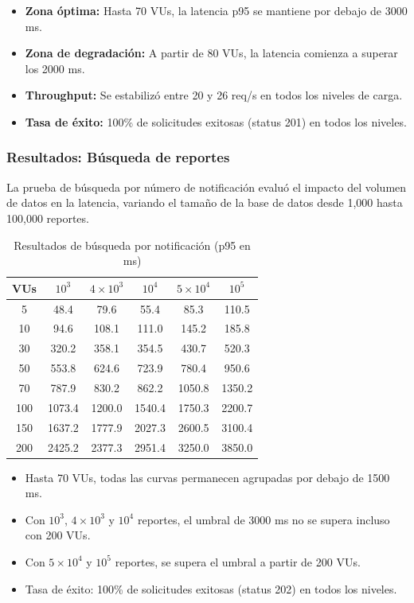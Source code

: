 \documentclass[12pt,letterpaper]{article}
\begin{document}
\begin{itemize}
    \item \textbf{Zona óptima:} Hasta 70 VUs, la latencia p95 se mantiene por debajo de 3000 ms.
    \item \textbf{Zona de degradación:} A partir de 80 VUs, la latencia comienza a superar los 2000 ms.
    \item \textbf{Throughput:} Se estabilizó entre 20 y 26 req/s en todos los niveles de carga.
    \item \textbf{Tasa de éxito:} 100\% de solicitudes exitosas (status 201) en todos los niveles.
\end{itemize}

\subsubsection{Resultados: Búsqueda de reportes}

La prueba de búsqueda por número de notificación evaluó el impacto del volumen de datos en la latencia, variando el tamaño de la base de datos desde 1,000 hasta 100,000 reportes.

\begin{table}[H]
\centering
\caption{Resultados de búsqueda por notificación (p95 en ms)}
\label{tab:busqueda-resultados}
\begin{tabular}{|c|c|c|c|c|c|}
\hline
\textbf{VUs} & \textbf{$10^3$} & \textbf{$4 \times 10^3$} & \textbf{$10^4$} & \textbf{$5 \times 10^4$} & \textbf{$10^5$} \\ \hline
5 & 48.4 & 79.6 & 55.4 & 85.3 & 110.5 \\ \hline
10 & 94.6 & 108.1 & 111.0 & 145.2 & 185.8 \\ \hline
30 & 320.2 & 358.1 & 354.5 & 430.7 & 520.3 \\ \hline
50 & 553.8 & 624.6 & 723.9 & 780.4 & 950.6 \\ \hline
70 & 787.9 & 830.2 & 862.2 & 1050.8 & 1350.2 \\ \hline
100 & 1073.4 & 1200.0 & 1540.4 & 1750.3 & 2200.7 \\ \hline
150 & 1637.2 & 1777.9 & 2027.3 & 2600.5 & 3100.4 \\ \hline
200 & 2425.2 & 2377.3 & 2951.4 & 3250.0 & 3850.0 \\ \hline
\end{tabular}
\end{table}

\begin{itemize}
    \item Hasta 70 VUs, todas las curvas permanecen agrupadas por debajo de 1500 ms.
    \item Con $10^3$, $4 \times 10^3$ y $10^4$ reportes, el umbral de 3000 ms no se supera incluso con 200 VUs.
    \item Con $5 \times 10^4$ y $10^5$ reportes, se supera el umbral a partir de 200 VUs.
    \item Tasa de éxito: 100\% de solicitudes exitosas (status 202) en todos los niveles.
\end{itemize}
\end{document}
